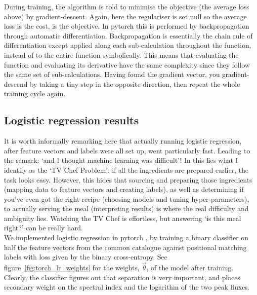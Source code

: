 \documentclass[12pt,a4paper]{article}
\begin{document}
During training, the algorithm is told to minimise the objective (the average loss above) by gradient-descent. Again, here the regulariser is set null so the average loss is the cost, is the objective. In pytorch \citep{torch} this is performed by backpropagation through automatic differentiation. Backpropagation is essentially the chain rule of differentiation except applied along each sub-calculation throughout the function, instead of to the entire function symbolically. This means that evaluating the function and evaluating its derivative have the same complexity since they follow the same set of sub-calculations. Having found the gradient vector, you gradient-descend by taking a tiny step in the opposite direction, then repeat the whole training cycle again.

\newpage
\subsection{Logistic regression results}
It is worth informally remarking here that actually running logistic regression, after feature vectors and labels were all set up, went particularly fast. Leading to the remark: `and I thought machine learning was difficult'! In this lies what I identify as the `TV Chef Problem': if all the ingredients are prepared earlier, the task looks easy. However, this hides that sourcing and preparing those ingredients (mapping data to feature vectors and creating labels), as well as determining if you've even got the right recipe (choosing models and tuning hyper-parameters), to actually serving the meal (interpreting results) is where the real difficulty and ambiguity lies. Watching the TV Chef is effortless, but answering `is this meal right?' can be really hard.\\

We implemented logistic regression in pytorch \citep{torch}, by training a binary classifier on half the feature vectors from the common catalogue against positional matching labels with loss given by the binary cross-entropy. See figure~\ref{fig:torch_lr_weights} for the weights, $\vec{\theta}$, of the model after training. Clearly, the classifier figures out that separation is very important, and places secondary weight on the spectral index and the logarithm of the two peak fluxes.\\
\end{document}
